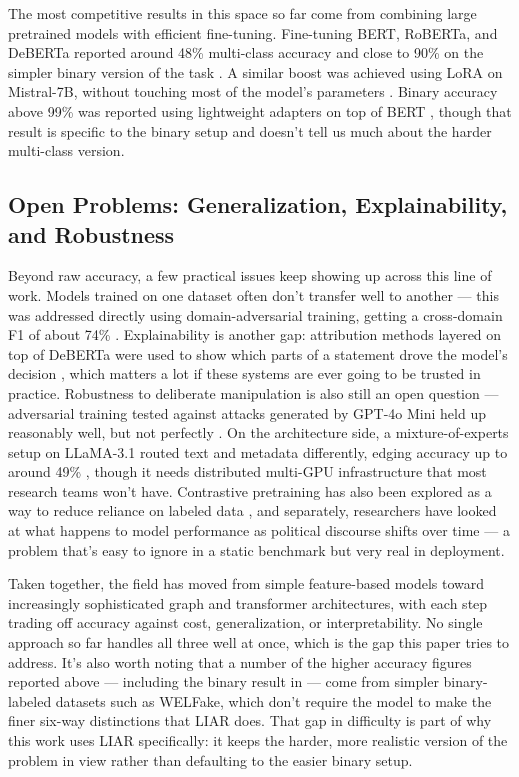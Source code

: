 \documentclass[a4paper,fleqn]{cas-sc}
\begin{document}
The most competitive results in this space so far come from combining large pretrained models with efficient fine-tuning. Fine-tuning BERT, RoBERTa, and DeBERTa reported around 48\% multi-class accuracy and close to 90\% on the simpler binary version of the task \citep{alqadi2025transfer}. A similar boost was achieved using LoRA on Mistral-7B, without touching most of the model's parameters \citep{thompson2025parameter}. Binary accuracy above 99\% was reported using lightweight adapters on top of BERT \citep{alghamdi2025abert}, though that result is specific to the binary setup and doesn't tell us much about the harder multi-class version.

\subsection{Open Problems: Generalization, Explainability, and Robustness}
Beyond raw accuracy, a few practical issues keep showing up across this line of work. Models trained on one dataset often don't transfer well to another — this was addressed directly using domain-adversarial training, getting a cross-domain F1 of about 74\% \citep{patel2025cross}. Explainability is another gap: attribution methods layered on top of DeBERTa were used to show which parts of a statement drove the model's decision \citep{nguyen2025explaining}, which matters a lot if these systems are ever going to be trusted in practice. Robustness to deliberate manipulation is also still an open question — adversarial training tested against attacks generated by GPT-4o Mini held up reasonably well, but not perfectly \citep{almansoori2025adversarial}. On the architecture side, a mixture-of-experts setup on LLaMA-3.1 routed text and metadata differently, edging accuracy up to around 49\% \citep{garcia2026hybrid}, though it needs distributed multi-GPU infrastructure that most research teams won't have. Contrastive pretraining has also been explored as a way to reduce reliance on labeled data \citep{sun2026self}, and separately, researchers have looked at what happens to model performance as political discourse shifts over time \citep{oconnor2026temporal} — a problem that's easy to ignore in a static benchmark but very real in deployment.

Taken together, the field has moved from simple feature-based models toward increasingly sophisticated graph and transformer architectures, with each step trading off accuracy against cost, generalization, or interpretability. No single approach so far handles all three well at once, which is the gap this paper tries to address. It's also worth noting that a number of the higher accuracy figures reported above — including the binary result in \citep{alqadi2025transfer} — come from simpler binary-labeled datasets such as WELFake, which don't require the model to make the finer six-way distinctions that LIAR does. That gap in difficulty is part of why this work uses LIAR specifically: it keeps the harder, more realistic version of the problem in view rather than defaulting to the easier binary setup.
\end{document}
